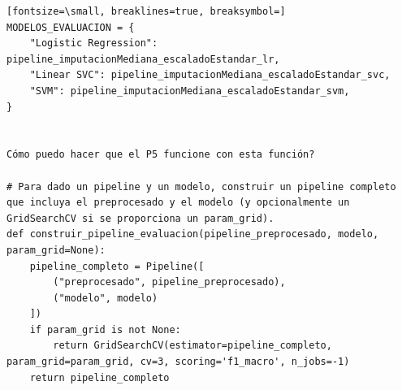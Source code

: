\documentclass[12pt,a4paper,oneside]{book}
\begin{document}
\begin{iaprompt}
\begin{Verbatim}[fontsize=\small, breaklines=true, breaksymbol=]
MODELOS_EVALUACION = {
    "Logistic Regression": pipeline_imputacionMediana_escaladoEstandar_lr,
    "Linear SVC": pipeline_imputacionMediana_escaladoEstandar_svc,
    "SVM": pipeline_imputacionMediana_escaladoEstandar_svm,
}


Cómo puedo hacer que el P5 funcione con esta función?

# Para dado un pipeline y un modelo, construir un pipeline completo que incluya el preprocesado y el modelo (y opcionalmente un GridSearchCV si se proporciona un param_grid).
def construir_pipeline_evaluacion(pipeline_preprocesado, modelo, param_grid=None):
    pipeline_completo = Pipeline([
        ("preprocesado", pipeline_preprocesado),
        ("modelo", modelo)
    ])
    if param_grid is not None:
        return GridSearchCV(estimator=pipeline_completo, param_grid=param_grid, cv=3, scoring='f1_macro', n_jobs=-1)
    return pipeline_completo
\end{Verbatim}
\end{iaprompt}
\end{document}
